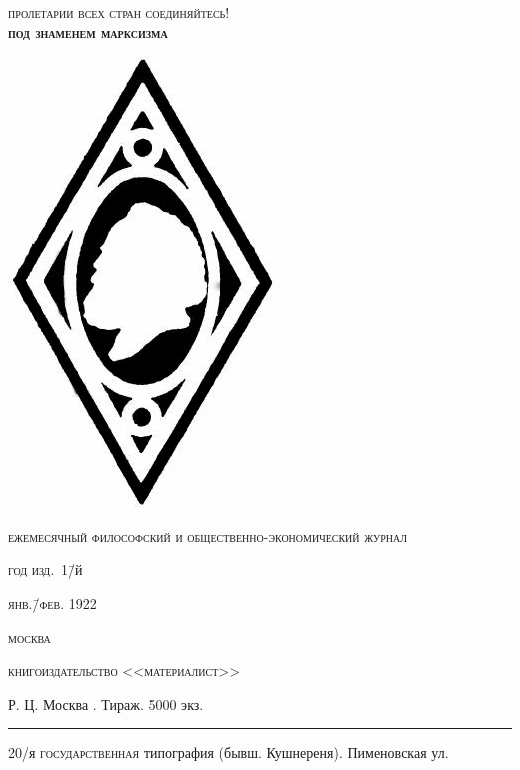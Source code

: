 \begin{titlepage}
 \begin{center}
  \textsc{пролетарии всех стран соединяйтесь!}\\[2em]
  {\Huge\textbf{\textsc{под знаменем марксизма}}}
  
  \includegraphics{1.png}
  
  {\LARGE\textsc{ежемесячный философский и общественно-экономический журнал}
  
  \vspace{1em}
  
  \textsc{год изд.}\ 1\=/й}\hfil {}\hfil {\LARGE\textsc{янв.\=/фев. 1922}
  
  \vspace{1em}
  
  \textsc{москва}
  
  \textsc{книгоиздательство <<материалист>>}}
 \end{center}

 \newpage
 \vspace*{\fill}
 Р. Ц. Москва .\hspace{\fill} Тираж. 5000 экз.\\
 \rule{\textwidth}{1pt}
 
 20\-/я \textsc{государственная} типография (бывш. Кушнереня). Пименовская ул.
\end{titlepage}
